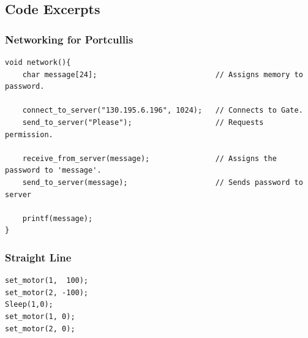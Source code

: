 \documentclass[paper=a4, fontsize=11pt]{scrartcl} %
\numberwithin{equation}{section} %
\numberwithin{figure}{section} %
\begin{document}
\subsection{Code Excerpts}
\subsubsection{Networking for Portcullis}
\begin{verbatim}
void network(){
	char message[24];							// Assigns memory to password.

	connect_to_server("130.195.6.196", 1024);	// Connects to Gate.
	send_to_server("Please");					// Requests permission.

	receive_from_server(message);				// Assigns the password to 'message'.
	send_to_server(message);					// Sends password to server

	printf(message);
}
\end{verbatim}
\subsubsection{Straight Line}
\begin{verbatim}
set_motor(1,  100);
set_motor(2, -100);
Sleep(1,0);
set_motor(1, 0);
set_motor(2, 0);

\end{verbatim}
\end{document}
